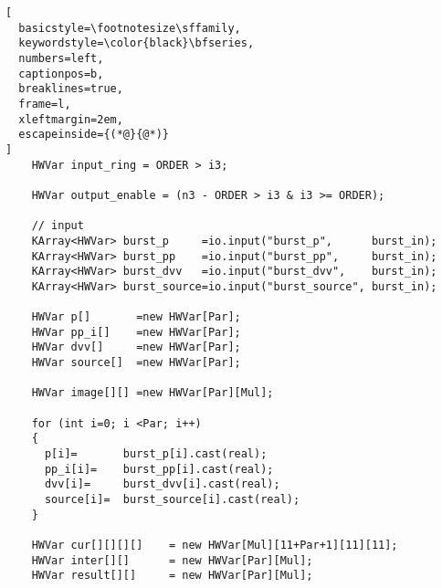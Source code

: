 \begin{lstlisting}[
  basicstyle=\footnotesize\sffamily,
  keywordstyle=\color{black}\bfseries,
  numbers=left,
  captionpos=b,
  breaklines=true,
  frame=l,
  xleftmargin=2em,
  escapeinside={(*@}{@*)}
]
    HWVar input_ring = ORDER > i3;

    HWVar output_enable = (n3 - ORDER > i3 & i3 >= ORDER);

    // input
    KArray<HWVar> burst_p     =io.input("burst_p",      burst_in);
    KArray<HWVar> burst_pp    =io.input("burst_pp",     burst_in);
    KArray<HWVar> burst_dvv   =io.input("burst_dvv",    burst_in);
    KArray<HWVar> burst_source=io.input("burst_source", burst_in);

    HWVar p[]       =new HWVar[Par];
    HWVar pp_i[]    =new HWVar[Par];
    HWVar dvv[]     =new HWVar[Par];
    HWVar source[]  =new HWVar[Par];

    HWVar image[][] =new HWVar[Par][Mul];

    for (int i=0; i <Par; i++)
    {
      p[i]=       burst_p[i].cast(real);
      pp_i[i]=    burst_pp[i].cast(real);
      dvv[i]=     burst_dvv[i].cast(real);
      source[i]=  burst_source[i].cast(real);
    }

    HWVar cur[][][][]    = new HWVar[Mul][11+Par+1][11][11];
    HWVar inter[][]      = new HWVar[Par][Mul];
    HWVar result[][]     = new HWVar[Par][Mul];



\end{lstlisting}
